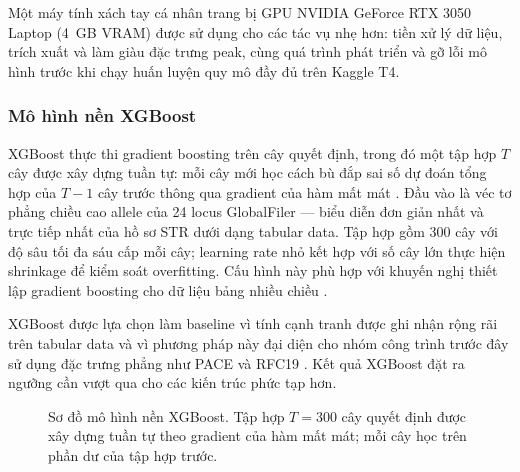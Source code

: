 \documentclass[12pt,a4paper]{article}
\begin{document}
Một máy tính xách tay cá nhân trang bị GPU NVIDIA GeForce RTX 3050 Laptop (4~GB VRAM) được sử dụng cho các tác vụ nhẹ hơn: tiền xử lý dữ liệu, trích xuất và làm giàu đặc trưng peak, cùng quá trình phát triển và gỡ lỗi mô hình trước khi chạy huấn luyện quy mô đầy đủ trên Kaggle T4.

\subsubsection{Mô hình nền XGBoost}

XGBoost thực thi gradient boosting trên cây quyết định, trong đó một tập hợp $T$ cây được xây dựng tuần tự: mỗi cây mới học cách bù đắp sai số dự đoán tổng hợp của $T-1$ cây trước thông qua gradient của hàm mất mát \cite{chen2016}. Đầu vào là véc tơ phẳng chiều cao allele của 24 locus GlobalFiler — biểu diễn đơn giản nhất và trực tiếp nhất của hồ sơ STR dưới dạng tabular data. Tập hợp gồm 300 cây với độ sâu tối đa sáu cấp mỗi cây; learning rate nhỏ kết hợp với số cây lớn thực hiện shrinkage để kiểm soát overfitting. Cấu hình này phù hợp với khuyến nghị thiết lập gradient boosting cho dữ liệu bảng nhiều chiều \cite{chen2016}.

XGBoost được lựa chọn làm baseline vì tính cạnh tranh được ghi nhận rộng rãi trên tabular data và vì phương pháp này đại diện cho nhóm công trình trước đây sử dụng đặc trưng phẳng như PACE \cite{marciano2017} và RFC19 \cite{benschop2019}. Kết quả XGBoost đặt ra ngưỡng cần vượt qua cho các kiến trúc phức tạp hơn.

\begin{figure}[H]
\centering
{}
\caption{Sơ đồ mô hình nền XGBoost. Tập hợp $T=300$ cây quyết định được xây dựng tuần tự theo gradient của hàm mất mát; mỗi cây học trên phần dư của tập hợp trước.}
\label{fig:xgb_arch}
\end{figure}
\end{document}
